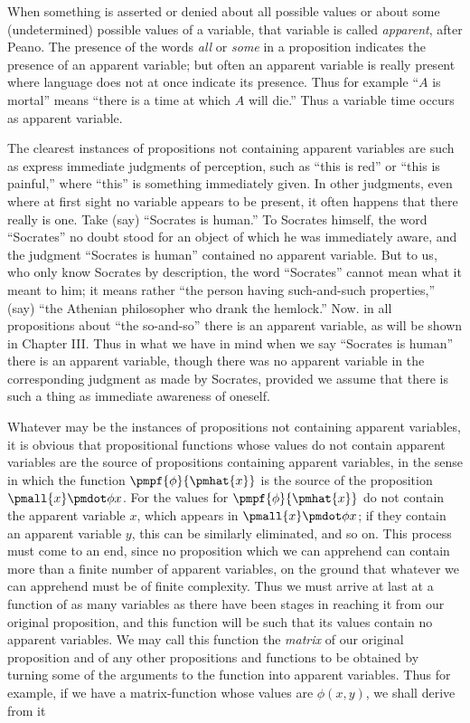 \documentclass[letterpaper,12pt,openany,leqno]{book}
\newcommand{\pagefirst}[1]{\marginnote[\boxed{\text{#1}}]{\boxed{\text{#1}}}}
\begin{document}
When something is asserted or denied about all possible values or about some (undetermined) possible values of a variable, that variable is called \textit{apparent}, after Peano. The presence of the words \textit{all} or \textit{some} in a proposition indicates the presence of an apparent variable; but often an apparent variable is really present where language does not at once indicate its presence. Thus for example ``$A$ is mortal'' means ``there is a time at which $A$ will die.'' Thus a variable time occurs as apparent variable.

The clearest instances of propositions not containing apparent variables are such as express immediate judgments of perception, such as ``this is red'' or ``this is painful,'' where ``this'' is something immediately given. In other \pagefirst{53} judgments, even where at first sight no variable appears to be present, it often happens that there really is one. Take (say) ``Socrates is human.'' To Socrates himself, the word ``Socrates'' no doubt stood for an object of which he was immediately aware, and the judgment ``Socrates is human'' contained no apparent variable. But to us, who only know Socrates by description, the word ``Socrates'' cannot mean what it meant to him; it means rather ``the person having such-and-such properties,'' (say) ``the Athenian philosopher who drank the hemlock.'' Now. in all propositions about ``the so-and-so'' there is an apparent variable, as will be shown in Chapter III. Thus in what we have in mind when we say ``Socrates is human'' there is an apparent variable, though there was no apparent variable in the corresponding judgment as made by Socrates, provided we assume that there is such a thing as immediate awareness of oneself.

Whatever may be the instances of propositions not containing apparent variables, it is obvious that propositional functions whose values do not contain apparent variables are the source of propositions containing apparent variables, in the sense in which the function $\pmpf{\phi}{\pmhat{x}}$ is the source of the proposition $\pmall{x}\pmdot\phi x$. For the values for $\pmpf{\phi}{\pmhat{x}}$ do not contain the apparent variable $x$, which appears in $\pmall{x}\pmdot\phi x$; if they contain an apparent variable $y$, this can be similarly eliminated, and so on. This process must come to an end, since no proposition which we can apprehend can contain more than a finite number of apparent variables, on the ground that whatever we can apprehend must be of finite complexity. Thus we must arrive at last at a function of as many variables as there have been stages in reaching it from our original proposition, and this function will be such that its values contain no apparent variables. We may call this function the \textit{matrix} of our original proposition and of any other propositions and functions to be obtained by turning some of the arguments to the function into apparent variables. Thus for example, if we have a matrix-function whose values are $\phi(x,y)$, we shall derive from it
\end{document}
